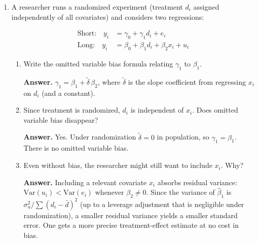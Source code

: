 \documentclass{article}
\begin{document}
\begin{enumerate}
\begin{enumerate}
  \item Give a specific example of a data-generating process where $\mathbb{E}[Y \mid X]$ is nonlinear in $X$.

  \textbf{Answer.} $Y = X^2 + \epsilon$ with $X \sim N(0,1)$ and $\epsilon$ independent of $X$.  Then $\mathbb{E}[Y \mid X] = X^2$, which is nonlinear.  In fact, the BLP slope is $\beta = \text{Cov}(X, X^2)/\text{Var}(X) = \mathbb{E}[X^3]/1 = 0$ by the symmetry of the normal distribution, so the BLP is just the constant $\mathbb{E}[Y] = 1$.  The linear predictor completely misses the U-shaped relationship.
\end{enumerate}

\item A researcher runs a randomized experiment (treatment $d_i$ assigned independently of all covariates) and considers two regressions:

\begin{align*}
  \text{Short:} \quad y_i &= \gamma_0 + \gamma_1 d_i + e_i \\
  \text{Long:}  \quad y_i &= \beta_0 + \beta_1 d_i + \beta_2 x_i + u_i
\end{align*}

\begin{enumerate}
  \item Write the omitted variable bias formula relating $\gamma_1$ to $\beta_1$.

  \textbf{Answer.} $\gamma_1 = \beta_1 + \tilde\delta\, \beta_2$, where $\tilde\delta$ is the slope coefficient from regressing $x_i$ on $d_i$ (and a constant).

  \item Since treatment is randomized, $d_i$ is independent of $x_i$.  Does omitted variable bias disappear?

  \textbf{Answer.} Yes. Under randomization $\tilde\delta = 0$ in population, so $\gamma_1 = \beta_1$.  There is no omitted variable bias.

  \item Even without bias, the researcher might still want to include $x_i$.  Why?

  \textbf{Answer.} Including a relevant covariate $x_i$ absorbs residual variance: $\text{Var}(u_i) < \text{Var}(e_i)$ whenever $\beta_2 \neq 0$. Since the variance of $\hat\beta_1$ is $\sigma_u^2 / \sum(d_i - \bar d)^2$ (up to a leverage adjustment that is negligible under randomization), a smaller residual variance yields a smaller standard error. One gets a more precise treatment-effect estimate at no cost in bias.
\end{enumerate}


\end{enumerate}
\end{document}
